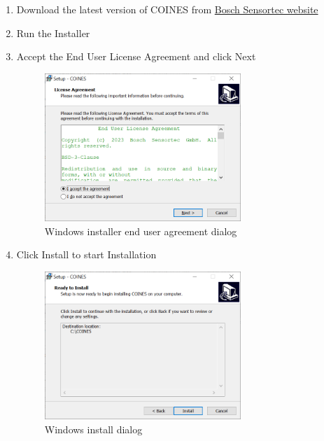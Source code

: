 \documentclass[11pt,headings=small]{scrartcl}
\begin{document}
\begin{enumerate}
	\item Download the latest version of COINES from \href{https://www.bosch-sensortec.com/software-tools/tools/coines/}{Bosch Sensortec website}
	\item Run the Installer
	\item Accept the End User License Agreement and click Next
	\begin{figure}[H]
		\begin{center}
			\includegraphics[width=0.7\textwidth]{coinesAPI_images/Windows_installation_user_agreement.png}
			\caption{Windows installer end user agreement dialog}
		\end{center}
	\end{figure}
	\item Click Install to start Installation
	\begin{figure}[H]
		\begin{center}
			\includegraphics[width=0.7\textwidth]{coinesAPI_images/Windows_install_dialog.png}
			\caption{Windows install dialog}
		\end{center}
	\end{figure}
\end{enumerate}
\end{document}

